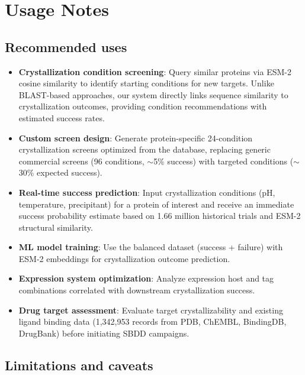 \documentclass[11pt]{article}
\begin{document}
\section*{Usage Notes}

\subsection*{Recommended uses}

\begin{itemize}
  \item \textbf{Crystallization condition screening}: Query similar proteins via ESM-2 cosine similarity to identify starting conditions for new targets. Unlike BLAST-based approaches, our system directly links sequence similarity to crystallization outcomes, providing condition recommendations with estimated success rates.
  \item \textbf{Custom screen design}: Generate protein-specific 24-condition crystallization screens optimized from the database, replacing generic commercial screens (96 conditions, $\sim$5\% success) with targeted conditions ($\sim$30\% expected success).
  \item \textbf{Real-time success prediction}: Input crystallization conditions (pH, temperature, precipitant) for a protein of interest and receive an immediate success probability estimate based on 1.66 million historical trials and ESM-2 structural similarity.
  \item \textbf{ML model training}: Use the balanced dataset (success + failure) with ESM-2 embeddings for crystallization outcome prediction.
  \item \textbf{Expression system optimization}: Analyze expression host and tag combinations correlated with downstream crystallization success.
  \item \textbf{Drug target assessment}: Evaluate target crystallizability and existing ligand binding data (1,342,953 records from PDB, ChEMBL, BindingDB, DrugBank) before initiating SBDD campaigns.
\end{itemize}

\subsection*{Limitations and caveats}
\end{document}
